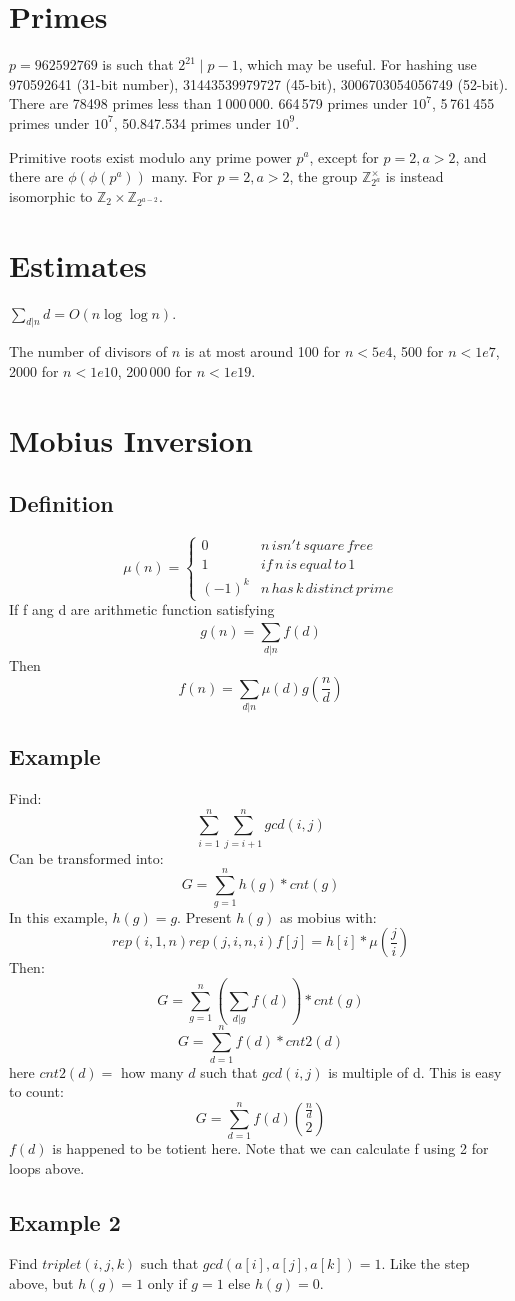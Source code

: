 \section{Primes}
$p=962592769$ is such that $2^{21} \mid p-1$, which may be useful. For hashing
use 970592641 (31-bit number), 31443539979727 (45-bit), 3006703054056749
(52-bit). There are 78498 primes less than 1\,000\,000. 664\,579 primes under $10^{7}$, 
5\,761\,455 primes under $10^{7}$, 50.847.534 primes under $10^{9}$.

Primitive roots exist modulo any prime power $p^a$, except for $p = 2, a > 2$, and there are $\phi(\phi(p^a))$ many.
For $p = 2, a > 2$, the group $\mathbb Z_{2^a}^\times$ is instead isomorphic to $\mathbb Z_2 \times \mathbb Z_{2^{a-2}}$.

\section{Estimates}
$\sum_{d|n} d = O(n \log \log n)$.

The number of divisors of $n$ is at most around 100 for $n < 5e4$, 500 for $n < 1e7$, 2000 for $n < 1e10$, 200\,000 for $n < 1e19$.

\section{Mobius Inversion}
\subsection{Definition}
\[\mu(n) =
	\left\{\begin{matrix}
	0 & n\,isn't\,square\,free\,\\ 
	1 & if\,n\,is\,equal\,to\,1  \\ 
	(-1)^{k} & n\,has\,k\,distinct\,prime    
	\end{matrix}\right.\]
	If f ang d are arithmetic function satisfying
	\[g(n)=\sum_{d|n}^{\,}f(d)\]
	Then
	\[f(n)=\sum_{d|n}^{\,}\mu(d)g(\frac{n}{d})\]
	\subsection{Example}
	Find:
	\[\sum_{i=1}^{n} \sum_{j=i+1}^{n} gcd(i,j)\]
	Can be transformed into:
	\[G = \sum_{g=1}^{n} h(g) * cnt(g)\]
	In this example, $h(g) = g$. Present $h(g)$ as mobius with:
	\[rep(i,1,n) rep(j,i,n,i) f[j]=h[i]*\mu(\frac{j}{i})\]
	Then:
	\[G = \sum_{g=1}^{n}(\sum_{d|g}f(d)) * cnt(g)\]
	\[G = \sum_{d=1}^{n} f(d) * cnt2(d)\] 
	here $cnt2(d) =$ how many $d$ such that $gcd(i,j)$ is multiple of d. This is easy to count:
	\[G = \sum_{d=1}^{n} f(d)\binom{\frac{n}{d}}{2}\] 
  $f(d)$ is happened to be totient here. Note that we can calculate f using 2 for loops above.

  \subsection{Example 2}
  Find $triplet(i,j,k)$ such that $gcd(a[i], a[j], a[k])=1$.
  Like the step above, but $h(g) = 1$ only if $g=1$ else $h(g)=0$.

	
							
